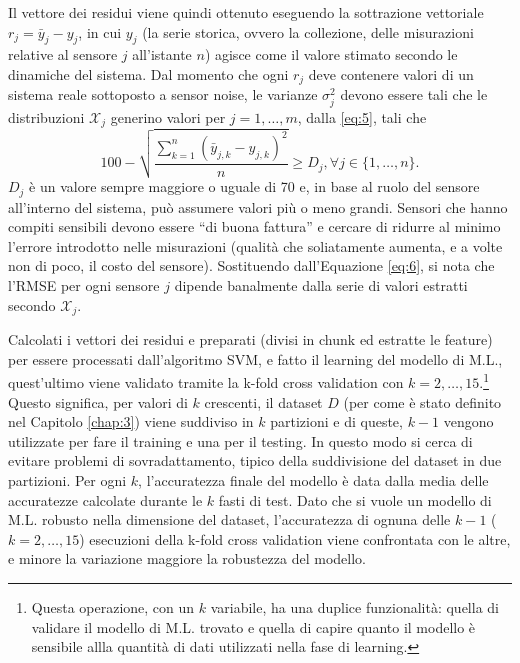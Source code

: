 \documentclass[Lau,binding=0.6cm]{sapthesis}
\begin{document}
Il vettore dei residui viene quindi ottenuto eseguendo la sottrazione vettoriale $r_j = \bar{y}_j - y_j$, in cui $y_j$ (la serie storica, ovvero la collezione, delle misurazioni relative al sensore $j$ all'istante $n$) agisce come il valore stimato secondo le dinamiche del sistema.
Dal momento che ogni $r_j$ deve contenere valori di un sistema reale sottoposto a sensor noise, le varianze $\sigma_j^2$ devono essere tali che le distribuzioni $\mathcal{X}_j$ generino valori per $j=1,\ldots,m$, dalla \ref{eq:5}, tali che
\begin{equation}
    100 - \sqrt{\frac{\sum_{k=1}^n (\bar{y}_{j,k} - y_{j,k})^2}{n}} \geq D_j, \forall j\in\{1,\ldots,n\}\label{eq:7}.
\end{equation}
$D_j$ \`e un valore sempre maggiore o uguale di 70 e, in base al ruolo del sensore all'interno del sistema, pu\`o assumere valori pi\`u o meno grandi.
Sensori che hanno compiti sensibili devono essere ``di buona fattura'' e cercare di ridurre al minimo l'errore introdotto nelle misurazioni (qualit\`a che soliatamente aumenta, e a volte non di poco, il costo del sensore).
Sostituendo dall'Equazione \ref{eq:6}, si nota che l'RMSE per ogni sensore $j$ dipende banalmente dalla serie di valori estratti secondo $\mathcal{X}_j$.

Calcolati i vettori dei residui e preparati (divisi in chunk ed estratte le feature) per essere processati dall'algoritmo SVM, e fatto il learning del modello di M.L., 
quest'ultimo viene validato tramite la k-fold cross validation con $k=2,\ldots,15$.\footnote{Questa operazione, con un $k$ variabile, ha una duplice funzionalit\`a: quella di validare il modello di M.L. trovato e quella di capire quanto il modello \`e sensibile allla quantit\`a di dati utilizzati nella fase di learning.}
Questo significa, per valori di $k$ crescenti, il dataset $D$ (per come \`e stato definito nel Capitolo \ref{chap:3}) viene suddiviso in $k$ partizioni e di queste, $k-1$ vengono utilizzate per fare il training e una per il testing.
In questo modo si cerca di evitare problemi di sovradattamento, tipico della suddivisione del dataset in due partizioni.
Per ogni $k$, l'accuratezza finale del modello \`e data dalla media delle accuratezze calcolate durante le $k$ fasti di test.
Dato che si vuole un modello di M.L. robusto nella dimensione del dataset, l'accuratezza di ognuna delle $k-1$ ($k = 2,\ldots,15$) esecuzioni della k-fold cross validation viene confrontata con le altre, e minore la variazione maggiore la robustezza del modello.

\end{document}
